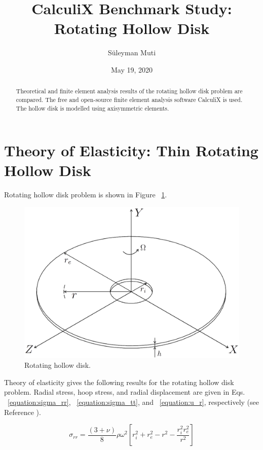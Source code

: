 \documentclass[12pt, a4paper, twoside]{article}
\title{CalculiX Benchmark Study:\\Rotating Hollow Disk}
\author{Süleyman Muti}
\date{May 19, 2020}
\begin{document}
\maketitle


\begin{abstract}
	
Theoretical and finite element analysis results of the rotating hollow disk problem are compared. The free and open-source finite element analysis software CalculiX is used. The hollow disk is modelled using axisymmetric elements.

\end{abstract}


\section{Theory of Elasticity: Thin Rotating\\Hollow Disk}
Rotating hollow disk problem is shown in Figure ~\ref{fig:rotating_disk_axisymmetric}. 

\begin{figure}[h]
	\centering
	\includegraphics[scale=0.5]{rotating_disk_axisymmetric}
	\caption{Rotating hollow disk.}
	\label{fig:rotating_disk_axisymmetric}
\end{figure}

Theory of elasticity gives the following results for the rotating hollow disk problem. Radial stress, hoop stress, and radial displacement are given in Eqs. ~\ref{equation:sigma_rr}, ~\ref{equation:sigma_tt}, and ~\ref{equation:u_r}, respectively (see Reference \cite{rotors_book}).

\begin{equation}
\label{equation:sigma_rr}
{{\sigma }_{rr}={\frac {(3+{\nu })} {8}}{\rho }{{\omega }^{2}}\left [ {{{r}^{2}_{i}}+{{r}^{2}_{e}}-{{r}^{2}}-{\frac {{{r}^{2}_{i}}{{r}^{2}_{e}}} {{r}^{2}}}} \right ]}
\end{equation}
\end{document}
